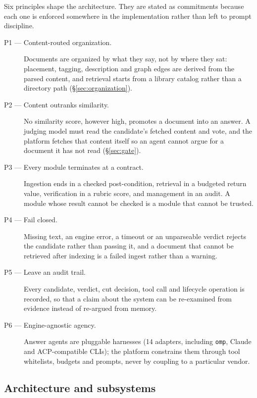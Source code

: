 Six principles shape the architecture. They are stated as commitments because
each one is enforced somewhere in the implementation rather than left to
prompt discipline.

\begin{description}
\item[P1 --- Content-routed organization.] Documents are organized by what
they say, not by where they sat: placement, tagging, description and graph
edges are derived from the parsed content, and retrieval starts from a
library catalog rather than a directory path (\S\ref{sec:organization}).
\item[P2 --- Content outranks similarity.] No similarity score, however high,
promotes a document into an answer. A judging model must read the candidate's
fetched content and vote, and the platform fetches that content itself so an
agent cannot argue for a document it has not read (\S\ref{sec:gate}).
\item[P3 --- Every module terminates at a contract.] Ingestion ends in a
checked post-condition, retrieval in a budgeted return value, verification in
a rubric score, and management in an audit. A module whose result cannot be
checked is a module that cannot be trusted.
\item[P4 --- Fail closed.] Missing text, an engine error, a timeout or an
unparseable verdict rejects the candidate rather than passing it, and a
document that cannot be retrieved after indexing is a failed ingest rather
than a warning.
\item[P5 --- Leave an audit trail.] Every candidate, verdict, cut decision,
tool call and lifecycle operation is recorded, so that a claim about the
system can be re-examined from evidence instead of re-argued from memory.
\item[P6 --- Engine-agnostic agency.] Answer agents are pluggable harnesses
(14 adapters, including \texttt{omp}, Claude and ACP-compatible CLIs); the
platform constrains them through tool whitelists, budgets and prompts, never
by coupling to a particular vendor.
\end{description}

\subsection{Architecture and subsystems}
\label{sec:architecture}

